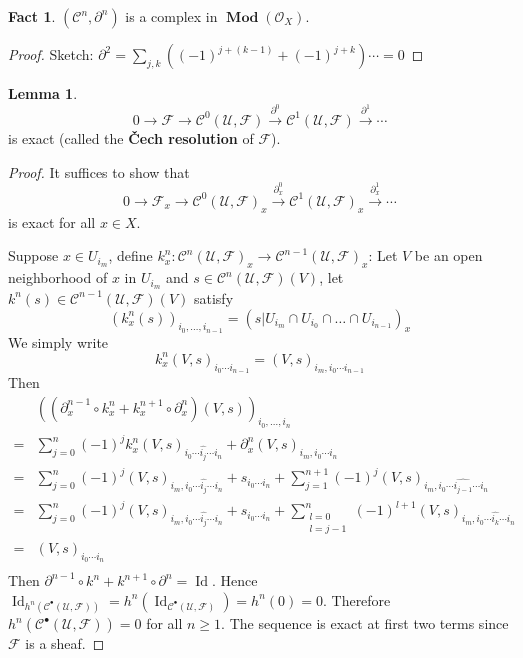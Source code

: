 \documentclass{amsart}
\numberwithin{equation}{section}
\theoremstyle{plain}
\theoremstyle{definition}
\newtheorem{lem}[equation]{Lemma}
\newtheorem{fact}[equation]{Fact}
\DeclareMathOperator{\Id}{Id}
\DeclareMathOperator{\Mod}{\mathbf{Mod}}
\begin{document}
\begin{fact}
	$ (\mathscr C^n, \partial^n) $ is a complex in $ \Mod(\mathcal O_X) $. 
\end{fact}

\begin{proof}
	Sketch: $ \partial^2=\sum\limits_{j,k}((-1)^{j+(k-1)}+(-1)^{j+k})\cdots=0$
\end{proof}

\begin{lem}
	\[0\to \mathscr F\to \mathscr C^0(\mathscr U, \mathscr F)\xrightarrow{\partial^0}\mathscr C^1(\mathscr U, \mathscr F)\xrightarrow{\partial^1}\cdots\]
	is exact (called the \textbf{\v{C}ech resolution} of $ \mathscr F $). 
\end{lem}

\begin{proof}
	It suffices to show that
	\[0\to \mathscr F_x\to \mathscr C^0(\mathscr U, \mathscr F)_x\xrightarrow{\partial_x^0}\mathscr C^1(\mathscr U, \mathscr F)_x\xrightarrow{\partial_x^1}\cdots\]
	is exact for all $ x\in X $. 
	
	Suppose $ x\in U_{i_m} $, define $ k^n_x:\mathscr C^n(\mathscr U, \mathscr F)_x\to \mathscr C^{n-1}(\mathscr U, \mathscr F)_x $: Let $ V $ be an open neighborhood of $ x $ in $ U_{i_m} $ and $ s\in \mathscr C^n(\mathscr U, \mathscr F)(V) $, let $ k^n(s)\in \mathscr C^{n-1}(\mathscr U, \mathscr F)(V) $ satisfy
	\[(k^n_x(s))_{i_0,\ldots,i_{n-1}}=(s|U_{i_m}\cap U_{i_0}\cap\ldots\cap U_{i_{n-1}})_x\]
	We simply write
	\[k_x^n(V,s)_{i_0\cdots i_{n-1}}
	=	(V,s)_{i_m,i_0\cdots i_{n-1}}
	\]
	Then \[
	\begin{array}{ll}
	&((\partial_x^{n-1}\circ k_x^n+k_x^{n+1}\circ \partial_x ^n)(V,s))_{i_0,\ldots,i_{n}}\\
	=&\sum\limits_{j=0}^{n}(-1)^jk_x^n(V,s)_{i_0\cdots \widehat{i_j}\cdots i_n}+\partial_x^n(V,s)_{i_m,i_0\cdots i_n}\\
	=&\sum\limits_{j=0}^{n}(-1)^j(V,s)_{i_m,i_0\cdots \widehat{i_j}\cdots i_n}+s_{i_0\cdots i_n}+\sum\limits_{j=1}^{n+1}(-1)^j(V,s)_{i_m,i_0\cdots\widehat{i_{j-1}}\cdots i_n}\\
	=&\sum\limits_{j=0}^{n}(-1)^j(V,s)_{i_m,i_0\cdots \widehat{i_j}\cdots i_n}+s_{i_0\cdots i_n}+\sum\limits_{\substack{l=0\\l=j-1}}^{n}(-1)^{l+1}(V,s)_{i_m,i_0\cdots\widehat{i_{k}}\cdots i_n}\\
	=&(V,s)_{i_0\cdots i_n}\\
	\end{array}
	\]
	Then $ \partial^{n-1}\circ k^n+k^{n+1}\circ \partial^n=\Id $. 
	Hence $ \Id_{h^n(\mathscr C^\bullet(\mathscr U,\mathscr F))}=h^n(\Id_{\mathscr C^\bullet(\mathscr U,\mathscr F)})=h^n(0)=0 $. Therefore $ h^n(\mathscr C^\bullet(\mathscr U,\mathscr F))=0 $ for all $ n\ge 1 $. 
	The sequence is exact at first two terms since $ \mathscr F $ is a sheaf. 
\end{proof}
\end{document}
